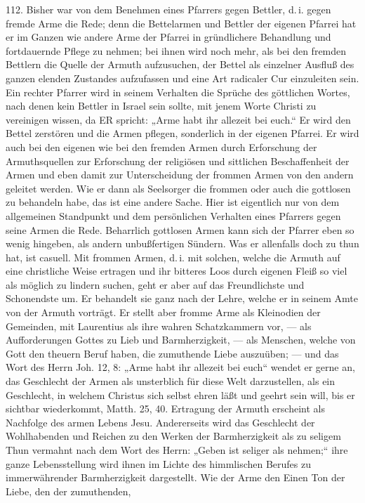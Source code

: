 112. Bisher war von dem Benehmen eines Pfarrers gegen Bettler, d.\,i. gegen fremde Arme die Rede; denn die Bettelarmen und Bettler der eigenen Pfarrei hat er im Ganzen wie andere Arme der Pfarrei in gründlichere Behandlung und fortdauernde Pflege zu nehmen; bei ihnen wird noch mehr, als bei den fremden Bettlern die Quelle der Armuth aufzusuchen, der Bettel als einzelner Ausfluß des ganzen elenden Zustandes aufzufassen und eine Art radicaler Cur einzuleiten sein. Ein rechter Pfarrer wird in seinem Verhalten die Sprüche des göttlichen Wortes, nach denen kein Bettler in Israel sein sollte, mit jenem Worte Christi zu vereinigen wissen, da ER spricht: „Arme habt ihr allezeit bei euch.“ Er wird den Bettel zerstören und die Armen pflegen, sonderlich in der eigenen Pfarrei. Er wird auch bei den eigenen wie bei den fremden Armen durch Erforschung der Armuthsquellen zur Erforschung der religiösen und sittlichen Beschaffenheit der Armen und eben damit zur Unterscheidung der frommen Armen von den andern geleitet werden. Wie er dann als Seelsorger die frommen oder auch die gottlosen zu behandeln habe, das
ist eine andere Sache. Hier ist eigentlich nur von dem allgemeinen Standpunkt und dem persönlichen Verhalten eines Pfarrers gegen seine Armen die Rede. Beharrlich gottlosen Armen kann sich der Pfarrer eben so wenig hingeben, als andern unbußfertigen Sündern. Was er allenfalls doch zu thun hat, ist casuell. Mit frommen Armen, d.\,i. mit solchen, welche die Armuth auf eine christliche Weise ertragen und ihr bitteres Loos durch eigenen Fleiß so viel als möglich zu lindern suchen, geht er aber auf das Freundlichste und Schonendste um. Er behandelt sie ganz nach der Lehre, welche er in seinem Amte von der Armuth vorträgt. Er stellt aber fromme Arme als Kleinodien der Gemeinden, mit Laurentius als ihre wahren Schatzkammern vor, — als Aufforderungen Gottes zu Lieb und Barmherzigkeit, — als Menschen, welche von Gott den theuern Beruf haben, die zumuthende Liebe auszuüben; — und das Wort des Herrn Joh. 12, 8: „Arme habt ihr allezeit bei euch“ wendet er gerne an, das Geschlecht der Armen als unsterblich für diese Welt darzustellen, als ein Geschlecht, in welchem Christus sich selbst ehren läßt und geehrt sein will, bis er sichtbar wiederkommt, Matth. 25, 40. Ertragung der Armuth erscheint als Nachfolge des armen Lebens Jesu. Andererseits wird das Geschlecht der Wohlhabenden und Reichen zu den Werken der Barmherzigkeit als zu seligem Thun vermahnt nach dem Wort des Herrn: „Geben ist seliger als nehmen;“ ihre ganze Lebensstellung wird ihnen im Lichte des himmlischen Berufes zu immerwährender Barmherzigkeit dargestellt. Wie der Arme den Einen Ton der Liebe, den der zumuthenden,
